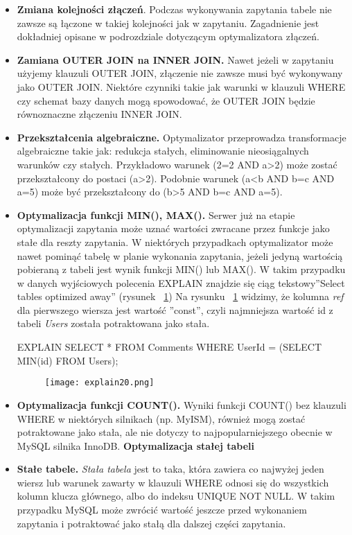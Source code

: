 \begin{itemize}
	\item \textbf{Zmiana kolejności złączeń}. Podczas wykonywania zapytania tabele nie zawsze są łączone w takiej kolejności jak w zapytaniu. Zagadnienie jest dokładniej opisane w podrozdziale dotyczącym optymalizatora złączeń.
	\item \textbf{Zamiana OUTER JOIN na INNER JOIN.} Nawet jeżeli w zapytaniu użyjemy klauzuli OUTER JOIN, złączenie nie zawsze musi być wykonywany jako OUTER JOIN. Niektóre czynniki takie jak warunki w klauzuli WHERE czy schemat bazy danych mogą spowodować, że OUTER JOIN będzie równoznaczne złączeniu INNER JOIN. 
	\item \textbf{Przekształcenia algebraiczne.} Optymalizator przeprowadza transformacje algebraiczne takie jak: redukcja stałych, eliminowanie nieosiągalnych warunków czy stałych. Przykładowo warunek (2=2 AND a>2) może zostać przekształcony do postaci (a>2). Podobnie warunek (a<b AND b=c AND a=5) może być przekształcony do (b>5 AND b=c AND a=5).
	\item \textbf{Optymalizacja funkcji MIN(), MAX().}
	Serwer już na etapie optymalizacji zapytania może uznać wartości zwracane przez funkcje jako stałe dla reszty zapytania. W niektórych przypadkach optymalizator może nawet pominąć tabelę w planie wykonania zapytania, jeżeli jedyną wartością pobieraną z tabeli jest wynik funkcji MIN() lub MAX(). W takim przypadku w danych wyjściowych polecenia EXPLAIN znajdzie się ciąg tekstowy''Select tables optimized away'' (rysunek ~\ref{fig:explain20})
	Na rysunku ~\ref{fig:explain20} widzimy, że kolumna \textit{ref} dla pierwszego wiersza jest wartość ''const'', czyli najmniejsza wartość id z tabeli \textit{Users} została potraktowana jako stała.
	\begin{spverbatim}
		EXPLAIN SELECT * FROM Comments WHERE UserId = (SELECT MIN(id) FROM Users);
	\end{spverbatim}
\begin{figure}
	\centering
	\texttt{[image: explain20.png]}
	\caption{}
	\label{fig:explain20}
\end{figure}
	\item \textbf{Optymalizacja funkcji COUNT().} Wyniki funkcji COUNT() bez klauzuli WHERE w niektórych silnikach (np. MyISM), również mogą zostać potraktowane jako stała, ale nie dotyczy to najpopularniejszego obecnie w MySQL silnika InnoDB.
	\textbf{Optymalizacja stałej tabeli}
	
	\item \textbf{Stałe tabele.} \textit{Stała tabela} jest to taka, która zawiera co najwyżej jeden wiersz lub warunek zawarty w klauzuli WHERE odnosi się do wszystkich kolumn klucza głównego, albo do indeksu UNIQUE NOT NULL. W takim przypadku MySQL może zwrócić wartość jeszcze przed wykonaniem zapytania i potraktować jako stałą dla dalszej części zapytania.
\end{itemize}

